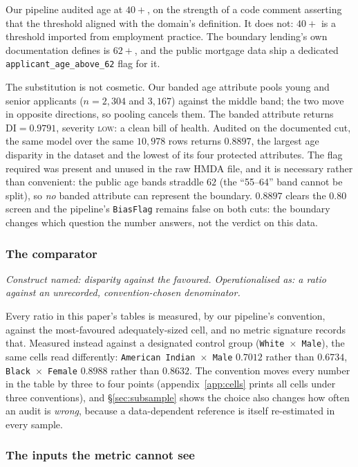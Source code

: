 \documentclass[sigconf,nonacm]{acmart}
\begin{document}
Our pipeline audited age at $40{+}$,
on the strength of a code comment asserting that the threshold aligned with
the domain's definition. It does not: $40{+}$ is a threshold imported from
employment practice. The boundary lending's own documentation defines is
$62{+}$, and the public mortgage data ship a dedicated
\texttt{applicant\_age\_above\_62} flag for it.

The substitution is not cosmetic. Our banded age attribute pools young and
senior applicants ($n{=}2{,}304$ and $3{,}167$) against the middle band; the
two move in opposite directions, so pooling cancels them. The banded attribute
returns $\mathrm{DI}=0.9791$, severity \textsc{low}: a clean bill of
health. Audited on the documented cut, the same model over the same $10{,}978$
rows returns $0.8897$, the largest age disparity in the dataset and the lowest
of its four protected attributes. The flag required was present and unused in
the raw HMDA file, and it is necessary rather than convenient: the public age
bands straddle $62$ (the ``55--64'' band cannot be split), so \emph{no} banded
attribute can represent the boundary. $0.8897$ clears the
$0.80$ screen and the pipeline's \texttt{BiasFlag} remains false on both cuts:
the boundary changes which question the number answers, not the verdict on
this data.

\subsubsection{The comparator}
\label{sec:reference}

\emph{Construct named: disparity against the favoured. Operationalised as: a
ratio against an unrecorded, convention-chosen denominator.}

Every ratio in this paper's tables is measured, by our pipeline's convention,
against the most-favoured adequately-sized cell, and no metric signature
records that. Measured instead against a designated control group
(\texttt{White $\times$ Male}), the same cells read differently: \texttt{American Indian $\times$
Male} $0.7012$ rather than $0.6734$, \texttt{Black $\times$ Female} $0.8988$
rather than $0.8632$. The convention moves every number in the table by three
to four points (appendix~\ref{app:cells} prints all cells under three
conventions), and \S\ref{sec:subsample} shows the choice also changes how
often an audit is \emph{wrong}, because a data-dependent reference is itself
re-estimated in every sample.

\subsubsection{The inputs the metric cannot see}
\label{sec:treatment}
\end{document}
